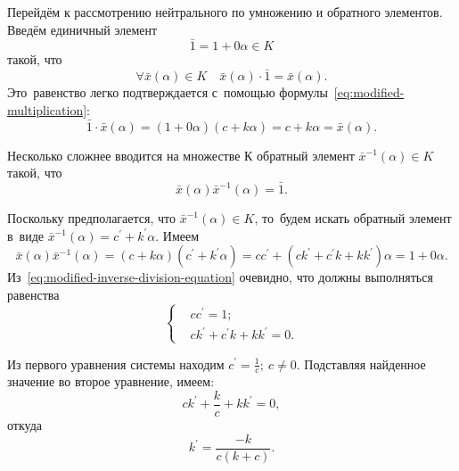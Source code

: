 Перейдём к рассмотрению нейтрального по умножению и обратного элементов. Введём единичный элемент
\begin{equation*}
  \bar{1}=1+0\alpha \in K
\end{equation*}
такой, что
\begin{equation*}
  \forall \bar{x}\left( \alpha  \right)\in K\quad \bar{x}\left( \alpha  \right)\cdot \bar{1}=\bar{x}\left( \alpha  \right).
\end{equation*}
Это~равенство легко подтверждается с~помощью формулы~\eqref{eq:modified-multiplication}:
\begin{equation*}
  \bar{1}\cdot \bar{x}(\alpha )=(1+0\alpha )(c+k\alpha )=c+k\alpha =\bar{x}(\alpha ).
\end{equation*}

Несколько сложнее вводится на множестве К обратный элемент $\bar{x}^{-1}\left( \alpha  \right)\in K$ такой, что
\begin{equation*}
  \bar{x}\left( \alpha  \right){{\bar{x}}^{-1}}\left( \alpha  \right)=\bar{1}.
\end{equation*}

Поскольку предполагается, что $\bar{x}^{-1}\left( \alpha  \right)\in K$, то~будем искать обратный элемент в~виде $\bar{x}^{-1}\left( \alpha \right)=c^{'}+k^{'}\alpha$. Имеем
\begin{equation}
\label{eq:modified-inverse-division-equation}
  \bar{x}\left( \alpha  \right)\bar{x}^{-1}\left( \alpha  \right)=\left( c+k\alpha  \right)\left(c^{'}+k^{'}\alpha \right)=cc^{'}+\left(ck^{'}+c^{'}k+kk^{'}\right)\alpha =1+0\alpha.
\end{equation}
Из~\eqref{eq:modified-inverse-division-equation} очевидно, что должны выполняться равенства
\begin{equation*}
  \left\{ \begin{aligned}
    & cc^{'}=1; \\ 
    & ck^{'}+c^{'}k+kk^{'}=0.
  \end{aligned} \right.
\end{equation*}

Из первого уравнения системы находим $\displaystyle c^{'}=\frac{1}{c};\ c\ne 0$. Подставляя найденное значение во второе уравнение, имеем:
\begin{equation*}
  ck^{'}+\frac{k}{c}+kk^{'}=0,
\end{equation*}
откуда
\begin{equation*}
  k^{'}=\frac{-k}{c\left(k+c\right)}.
\end{equation*}

